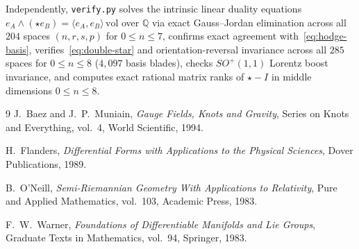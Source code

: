 \documentclass[11pt]{article}
\theoremstyle{definition}
\newcommand{\Q}{\mathbb{Q}}
\newcommand{\vol}{\mathrm{vol}}
\begin{document}
Independently, \texttt{verify.py} solves the intrinsic linear duality equations $e_A \wedge (\star e_B) = \langle e_A, e_B \rangle\,\vol$ over $\Q$ via exact Gauss--Jordan elimination across all $204$ spaces $(n, r, s, p)$ for $0 \le n \le 7$, confirms exact agreement with~\eqref{eq:hodge-basis}, verifies~\eqref{eq:double-star} and orientation-reversal invariance across all $285$ spaces for $0 \le n \le 8$ ($4{,}097$ basis blades), checks $SO^+(1,1)$ Lorentz boost invariance, and computes exact rational matrix ranks of $\star - I$ in middle dimensions $0 \le n \le 8$.

\begin{thebibliography}{9}
J.~Baez and J.~P.~Muniain, \emph{Gauge Fields, Knots and Gravity}, Series on Knots and Everything, vol.~4, World Scientific, 1994.

H.~Flanders, \emph{Differential Forms with Applications to the Physical Sciences}, Dover Publications, 1989.

B.~O'Neill, \emph{Semi-Riemannian Geometry With Applications to Relativity}, Pure and Applied Mathematics, vol.~103, Academic Press, 1983.

F.~W.~Warner, \emph{Foundations of Differentiable Manifolds and Lie Groups}, Graduate Texts in Mathematics, vol.~94, Springer, 1983.
\end{thebibliography}
\end{document}
